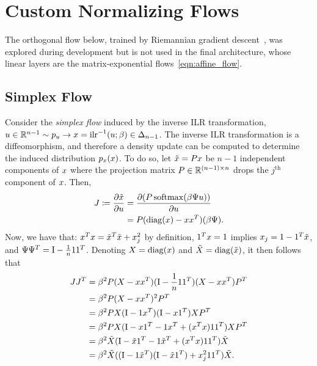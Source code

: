 \section{Custom Normalizing Flows}

\label{sec:apx:custom_flows}

The orthogonal flow below, trained by Riemannian gradient descent~\citep{absil_optimization_2008}, was explored during development but is not used in the final architecture, whose linear layers are the matrix-exponential flows~\eqref{eqn:affine_flow}.

\subsection{Simplex Flow}\label{sec:apx:xform_simplex}

Consider the \textit{simplex flow} induced by the inverse \gls*{ILR} transformation, $\vv{u} \in \mathbb{R}^{n-1} \sim p_{\vv{u}} \rightarrow \vv{x} = \InvILR{\vv{u}; \beta} \in \ProbSimplex{n-1}$.
The inverse \gls*{ILR} transformation is a diffeomorphism, and therefore a density update can be computed to determine the induced distribution $p_{x}(x)$.
To do so, let $\tilde{x} = P x$ be $n-1$ independent components of $x$ where the projection matrix $P \in \mathbb{R}^{(n-1) \times n}$ drops the $j^{\text{th}}$ component of $x$.
Then,
\begin{align*}
    \vv{J} \coloneqq \frac{\partial{\tilde{\vv{x}}}}{\partial{\vv{u}}}
     & = \frac{\partial (\vv{P} \Softmax{\beta \vv{\Psi} \vv{u}})}{\partial{\vv{u}}} \\
     & = \vv{P} (\Diag{\vv{x}} - \vv{x} \vv{x}^T) (\beta \vv{\Psi}).
\end{align*}
Now, we have that: $x^T x = \tilde{x}^T \tilde{x} + x_{j}^2$ by definition, $\mathrm{1}^T x = 1$ implies $x_{j} = 1 - \mathrm{1}^T \tilde{x}$, and $\Psi \Psi^T = \mathrm{I} - \frac{1}{n} \mathrm{1} \mathrm{1}^T$.
Denoting $\vv{X} = \Diag{\vv{x}}$ and $\tilde{\vv{X}} = \Diag{\tilde{\vv{x}}}$, it then follows that
\begin{align*}
    J J^T
     & = \beta^2 P (X - x x^T) (\mathrm{I} - \frac{1}{n} \mathrm{1} \mathrm{1}^T) (X - x x^T) P^T                   \\
     & = \beta^2 P (X - x x^T)^2 P^T                                                                            \\
     & = \beta^2 P X (\mathrm{I} - \mathrm{1} x^T) (\mathrm{I} - x \mathrm{1}^T) X P^T                                               \\
     & = \beta^2 P X (\mathrm{I} - x \mathrm{1}^T - \mathrm{1} x^T + (x^T x) \mathrm{1} \mathrm{1}^T) X P^T                     \\
     & = \beta^2 \tilde{X} (\mathrm{I} - \tilde{x} \mathrm{1}^T - \mathrm{1} \tilde{x}^T + (x^T x) \mathrm{1} \mathrm{1}^T) \tilde{X}     \\
     & = \beta^2 \tilde{X} ((\mathrm{I} - \mathrm{1} \tilde{x}^T) (\mathrm{I} - \tilde{x} \mathrm{1}^T) + x_{j}^2 \mathrm{1} \mathrm{1}^T) \tilde{X}.
\end{align*}
